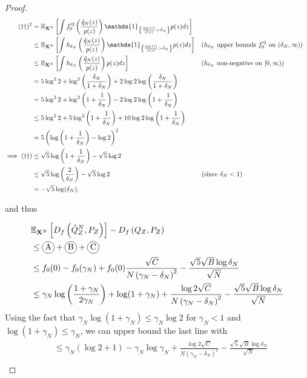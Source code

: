 \begin{proof}
\begin{align*}
    (\dagger\dagger)^2 
    &= \E_{\XN} \left[\int f_0'^2\left(\frac{\hat{q}_N(z)}{p(z)} \right) \mathds{1}_{\left\lbrace \frac{\hat{q}_N(z)}{p(z)} > \delta_N \right\rbrace} p(z) dz \right]
    \\
    &\leq \E_{\XN} \left[\int h_{\delta_N}\left(\frac{\hat{q}_N(z)}{p(z)} \right) \mathds{1}_{\left\lbrace \frac{\hat{q}_N(z)}{p(z)} > \delta_N \right\rbrace} p(z) dz \right]
    && \text{($h_{\delta_N}$ upper bounds $f_0'^2$ on $(\delta_N, \infty)$)}
    \\
    &\leq \E_{\XN} \left[\int h_{\delta_N}\left(\frac{\hat{q}_N(z)}{p(z)} \right) p(z) dz \right]
    && \text{($h_{\delta_N}$ non-negative on $[0, \infty)$)}
    \\
    &= 5\log^2 2 + \log^2\left( \frac{\delta_N}{1+\delta_N} \right) + 2\log 2 \log\left( \frac{\delta_N}{1+\delta_N} \right)\\
    &= 5\log^2 2 + \log^2\left(1 + \frac{1}{\delta_N}\right) - 2\log 2 \log\left(1 + \frac{1}{\delta_N}\right)\\
    &\leq 5\log^2 2 + 5\log^2\left(1 + \frac{1}{\delta_N}\right) + 10\log 2 \log\left(1 + \frac{1}{\delta_N}\right)\\
    &=5\left(\log\left(1 + \frac{1}{\delta_N} \right) - \log 2\right)^2\\
    \implies (\dagger\dagger)&\leq 
    \sqrt{5}\log\left(1 + \frac{1}{\delta_N} \right) - \sqrt{5}\log 2 \\
    &\leq \sqrt{5}\log\left(\frac{2}{\delta_N} \right) - \sqrt{5}\log 2 && \text{(since $\delta_N<1$)}\\
    &= -\sqrt{5}\log(\delta_N).
\end{align*}

and thus

\begin{align*}
    &\E_{\XN} \left[ D_f\left( \hat{Q}_Z^N , P_Z\right)\right] - D_f\left( Q_{Z} , P_Z\right)\\
    &\leq \encircle{A} + \encircle{B} + \encircle{C} \\
    &\leq f_0(0) - f_0(\gamma_N) + f_0(0) \frac{\sqrt{C}}{N \left( \gamma_N - \delta_N \right)^2} - \frac{\sqrt{5}\sqrt{B}\log \delta_N}{\sqrt{N}}\\
    &\leq \gamma_N \log\left(\frac{1+\gamma_N}{2\gamma_N}\right) + \log(1+\gamma_N) + \frac{\log2\sqrt{C}}{N \left( \gamma_N - \delta_N \right)^2} - \frac{\sqrt{5}\sqrt{B} \log \delta_N}{\sqrt{N}} \\
\end{align*}
Using the fact that $\gamma_N \log(1+\gamma_N) \leq \gamma_N \log2$ for $\gamma_N < 1$ and $\log(1+ \gamma_N) \leq \gamma_N$, we can upper bound the last line with
\begin{align*}
    &\leq \gamma_N \left(\log2 + 1\right)   - \gamma_N \log \gamma_N  + \frac{\log2\sqrt{C}}{N \left( \gamma_N - \delta_N \right)^2} - \frac{\sqrt{5}\sqrt{B} \log \delta_N}{\sqrt{N}} \\
\end{align*}


\end{proof}
